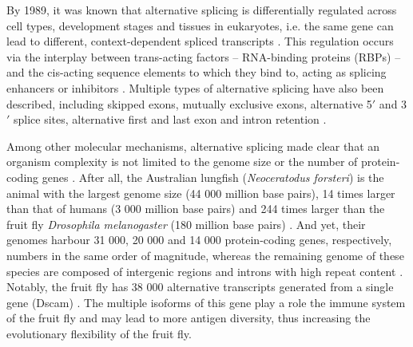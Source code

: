 By 1989, it was known that alternative splicing is differentially regulated across cell types, development stages and tissues in eukaryotes, i.e. the same gene can lead to different, context-dependent spliced transcripts \cite{smith:1989tr}. This regulation occurs via the interplay between trans-acting factors -- RNA-binding proteins (RBPs) -- and the cis-acting sequence elements to which they bind to, acting as splicing enhancers or inhibitors \cite{smith:1989tr}. Multiple types of alternative splicing have also been described, including skipped exons, mutually exclusive exons, alternative 5$'$ and 3$'$ splice sites, alternative first and last exon and intron retention \cite{smith:1989tr}.



Among other molecular mechanisms, alternative splicing made clear that an organism complexity is not limited to the genome size or the number of protein-coding genes \cite{}. After all, the Australian lungfish (\emph{Neoceratodus forsteri}) is the animal with the largest genome size (44 000 million base pairs), 14 times larger than that of humans (3 000 million base pairs) and 244 times larger than the fruit fly \emph{Drosophila melanogaster} (180 million base pairs) \cite{meyer:2021vn,dmelanogaster}. And yet, their genomes harbour 31 000, 20 000 and 14 000 protein-coding genes, respectively, numbers in the same order of magnitude, whereas the remaining genome of these species are composed of intergenic regions and introns with high repeat content \cite{meyer:2021vn,dmelanogaster}. Notably, the fruit fly has 38 000 alternative transcripts generated from a single gene (Dscam) \cite{schmucker:2000wf}. The multiple isoforms of this gene play a role the immune system of the fruit fly and may lead to more antigen diversity, thus increasing the evolutionary flexibility of the fruit fly.




